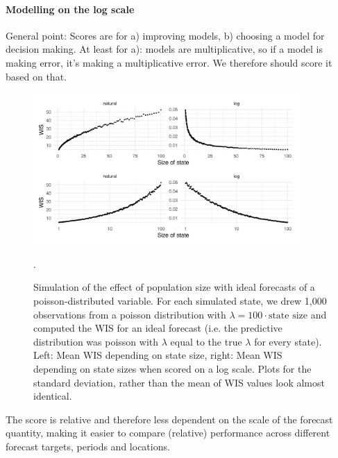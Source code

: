 \documentclass{article}
\begin{document}
\paragraph{Modelling on the log scale}

General point: Scores are for a) improving models, b) choosing a model for decision making. 
At least for a): models are multiplicative, so if a model is making error, it's making a multiplicative error. We therefore should score it based on that. 






\begin{figure}[h!]
    \centering
    \includegraphics[width=0.9\textwidth]{output/figures/SIM-mean-sd-state-size.png}
    \caption{Simulation of the effect of population size with ideal forecasts of a poisson-distributed variable. For each simulated state, we drew 1,000 observations from a poisson distribution with $\lambda = 100 \cdot \text{state size}$ and computed the WIS for an ideal forecast (i.e. the predictive distribution was poisson with $\lambda$ equal to the true $\lambda$ for every state). Left: Mean WIS depending on state size, right: Mean WIS depending on state sizes when scored on a log scale. Plots for the standard deviation, rather than the mean of WIS values look almost identical.}. 
    \label{fig:log-crps-viz}
\end{figure}


The score is relative and therefore less dependent on the scale of the forecast quantity, making it easier to compare (relative) performance across different forecast targets, periods and locations. 
\end{document}
